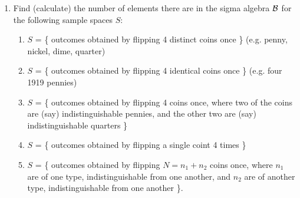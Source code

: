 \documentclass[12pt]{article}
\begin{document}
\begin{enumerate}
\item
Find (calculate) the number of elements there are in the sigma algebra $\cal{B}$ for
the following sample spaces $S$:
\begin{enumerate}
\item $S$ = \{ outcomes obtained by flipping 4 distinct coins once \} (e.g. penny, nickel, dime, quarter)
\item $S$ = \{ outcomes obtained by flipping 4 identical coins once \} (e.g. four 1919 pennies)
\item $S$ = \{ outcomes obtained by flipping 4 coins once, where two of the coins are (say)
    indistinguishable pennies, and the other two are (say) indistinguishable quarters \}
\item $S$ = \{ outcomes obtained by flipping a single coint 4 times \}
\item $S$ = \{ outcomes obtained by flipping $N = n_1 + n_2$ coins once, where $n_1$ are of one type, indistinguishable
from one another, and $n_2$ are of another type, indistinguishable from one another \}.
\end{enumerate}

\end{enumerate}
\end{document}
